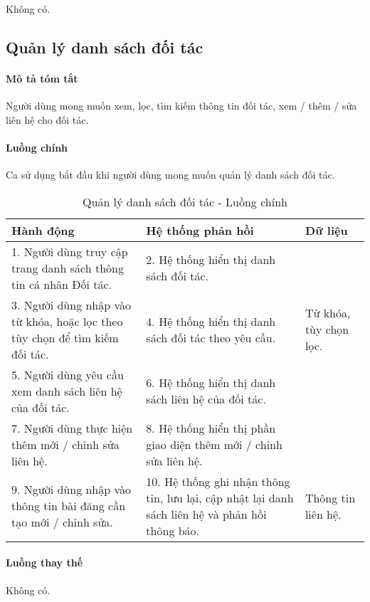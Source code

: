 \documentclass[./../main.tex]{subfiles}
\begin{document}
Không có.

\subsection{Quản lý danh sách đối tác}

\paragraph*{Mô tả tóm tắt}

Người dùng mong muốn xem, lọc, tìm kiếm thông tin đối tác, xem / thêm / sửa liên hệ cho đối tác.

\paragraph*{Luồng chính} Ca sử dụng bắt đầu khi người dùng mong muốn quản lý danh sách đối tác.

\begin{table}[H]
  \caption{Quản lý danh sách đối tác - Luồng chính}
  \label{tab:orgAdmin_manage_partners}
  \begin{tabularx}{\textwidth}{|X|X|X|}
    \hline
    \textbf{Hành động} & \textbf{Hệ thống phản hồi} & \textbf{Dữ liệu} \\ \hline
    1. Người dùng truy cập trang danh sách thông tin cá nhân Đối tác. & 2. Hệ thống hiển thị danh sách đối tác. &  \\ \hline
    3. Người dùng nhập vào từ khóa, hoặc lọc theo tùy chọn để tìm kiếm đối tác. & 4. Hệ thống hiển thị danh sách đối tác theo yêu cầu. & Từ khóa, tùy chọn lọc. \\ \hline
    5. Người dùng yêu cầu xem danh sách liên hệ của đối tác. & 6. Hệ thống hiển thị danh sách liên hệ của đối tác. &  \\ \hline
    7. Người dùng thực hiện thêm mới / chỉnh sửa liên hệ. & 8. Hệ thống hiển thị phần giao diện thêm mới / chỉnh sửa liên hệ. &  \\ \hline
    9. Người dùng nhập vào thông tin bài đăng cần tạo mới / chỉnh sửa. & 10. Hệ thống ghi nhận thông tin, lưu lại, cập nhật lại danh sách liên hệ và phản hồi thông báo. & Thông tin liên hệ. \\ \hline
  \end{tabularx}
\end{table}

\paragraph*{Luồng thay thế} Không có.
\end{document}
